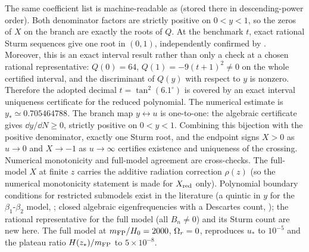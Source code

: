 The same coefficient list is machine-readable as  (stored there in descending-power order). Both denominator factors are strictly positive on $0<y<1$, so the zeros of $X$ on the branch are exactly the roots of $Q$. At the benchmark $t$, exact rational Sturm sequences give one root in $(0,1)$, independently confirmed by . Moreover, this is an exact interval result rather than only a check at a chosen rational representative: $Q(0)=64$, $Q(1)=-9(t+1)^2\neq0$ on the whole certified interval, and the discriminant of $Q(y)$ with respect to $y$ is nonzero. Therefore the adopted decimal $t=\tan^2(6.1^\circ)$ is covered by an exact interval uniqueness certificate for the reduced polynomial. The numerical estimate is $y_*\simeq0.705464788$. The branch map $y\leftrightarrow u$ is one-to-one: the algebraic certificate gives $\dd y/\dd N\ge0$, strictly positive on $0<y<1$. Combining this bijection with the positive denominator, exactly one Sturm root, and the endpoint signs $X>0$ as $u\to0$ and $X\to-1$ as $u\to\infty$ certifies existence and uniqueness of the crossing. Numerical monotonicity and full-model agreement are cross-checks. The full-model $X$ at finite $z$ carries the additive radiation correction $\rho(z)$ (so the numerical monotonicity statement is made for $X_{\rm red}$ only). Polynomial boundary conditions for restricted submodels exist in the literature (a quintic in $y$ for the $\beta_1$-$\beta_2$ model, \citealp[Eq.~39]{Akrami2015}; closed algebraic eigenfrequencies with a Descartes count, \citealp{Konnig2014}); the rational representative for the full model (all $B_n\neq0$) and its Sturm count are new here. The full model at $m_{\mathrm{FP}}/H_0=2000$, $\Omega_{r}=0$, reproduces $u_*$ to $10^{-5}$ and the plateau ratio $H(z_*)/m_{\mathrm{FP}}$ to $5\times10^{-8}$.

